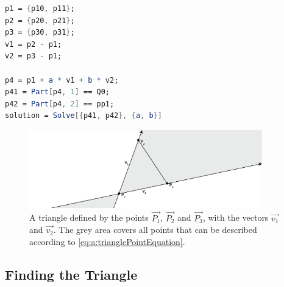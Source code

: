 	\begin{lstlisting}[float, language=Mathematica, label={lst:a:pointInTriangleMathematica}, caption={Mathematica code used to compute the to compute $a$ and $b$.}]
p1 = {p10, p11};
p2 = {p20, p21};
p3 = {p30, p31};
v1 = p2 - p1;
v2 = p3 - p1;

p4 = p1 + a * v1 + b * v2;
p41 = Part[p4, 1] == Q0;
p42 = Part[p4, 2] == pp1;
solution = Solve[{p41, p42}, {a, b}]
	\end{lstlisting}

\begin{figure}
	\centering
	\includegraphics[width=0.9\textwidth, frame]{./img/1_triangle_point-01}
	\caption{A triangle defined by the points $\vec{P_1}$, $\vec{P_2}$ and $\vec{P_3}$, with the vectors $\vec{v_1}$ and $\vec{v_2}$. The grey area covers all points that can be described according to \eqref{eq:a:trianglePointEquation}.}
	\label{fig:a:triangle_point}
\end{figure}




\subsection{Finding the Triangle}

